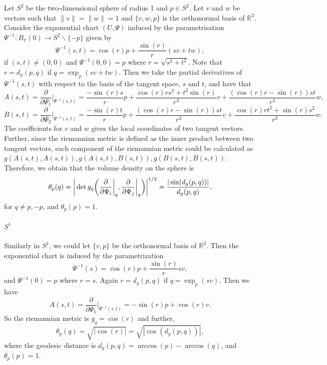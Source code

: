 \documentclass[11pt,a4paper,]{article}
\begin{document}
Let \(S^2\) be the two-dimensional sphere of radius 1 and \(p \in S^2\). Let \(v\) and \(w\) be vectors such that \(\|v\| = \|w\| = 1\) and \(\{v, w, p\}\) is the orthonormal basis of \(\mathbb{R}^3\). Consider the exponential chart \((U, \Psi)\) induced by the parametrisation \(\Psi^{-1}: B_\pi(0) \rightarrow S^2 \backslash \{-p\}\) given by
\[
\Psi^{-1}(s,t) = \cos(r)p + \frac{\sin(r)}{r}(sv+tw),
\]
if \((s,t) \neq (0,0)\) and \(\Psi^{-1}(0,0)=p\) where \(r=\sqrt{s^2 + t^2}\).
Note that \(r=d_g(p,q)\) if \(q = \exp_p(sv+tw)\).
Then we take the partial derivatives of \(\Psi^{-1}(s,t)\) with respect to the basis of the tangent space, \(s\) and \(t\), and have that
\[
A(s,t) = \frac{\partial}{\partial \Psi_1} \bigg|_{\Psi^{-1}(s,t)} = \frac{-\sin{(r)}s}{r}p + \frac{\cos(r)rs^2+t^2\sin(r)}{r^3}v + \frac{(\cos(r)r-\sin(r))st}{r^3}w,
\]
\[
B(s,t) = \frac{\partial}{\partial \Psi_2} \bigg|_{\Psi^{-1}(s,t)} = \frac{-\sin{(r)}t}{r}p + \frac{(\cos(r)r-\sin(r))st}{r^3}v + \frac{\cos(r)rt^2+\sin(r)s^2}{r^3}w.
\]
The coefficients for \(v\) and \(w\) gives the local coordinates of two tangent vectors.
Further, since the riemannian metric is defined as the inner product between two tangent vectors, each component of the riemannian metric could be calculated as \(g(A(s,t), A(s,t)), g(A(s,t), B(s,t)), g(B(s,t), B(s,t))\).
Therefore, we obtain that the volume density on the sphere is
\[
\theta_p(q) = \bigg| \det g_q\bigg( \frac{\partial}{\partial \Psi_i}\bigg|_q, \frac{\partial}{\partial \Psi_j}\bigg|_q \bigg) \bigg|^{1/2} \\
= \frac{|\sin(d_g(p,q))|}{d_g(p,g)},
\]
for \(q \neq p, -p\), and \(\theta_p(p) = 1\).

\hypertarget{s1}{%
\paragraph{\texorpdfstring{\(S^1\)}{S\^{}1}}\label{s1}}

Similarly in \(S^1\), we could let \(\{v, p\}\) be the orthonormal basis of \(\mathbb{R}^2\). Then the exponential chart is induced by the parametrization
\[
\Psi^{-1}(s) = \cos(r)p + \frac{\sin(r)}{r}sv,
\]
and \(\Psi^{-1}(0) = p\) where \(r = s\). Again \(r = d_g(p,q)\) if \(q = \exp_p(sv)\). Then we have
\[
A(s,t) = \frac{\partial}{\partial \Psi_1} \bigg|_{\Psi^{-1}(s,t)} = - \sin(r)p + \cos(r)v.
\]
So the riemannian metric is \(g_q = \cos(r)\) and further,
\[
\theta_p(q) = \sqrt{|\cos(r)|} = \sqrt{|\cos(d_g(p,q))|},
\]
where the geodesic distance is \(d_g(p,q) = \arccos(p) - \arccos(q)\), and \(\theta_p(p) = 1\).

\printbibliography
\end{document}
